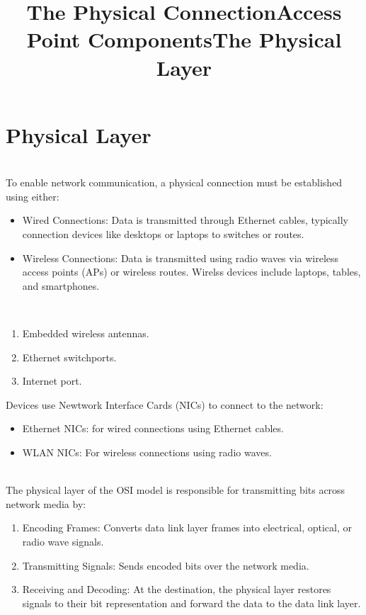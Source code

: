\documentclass[a4paper,11pt]{article}
\begin{document}
\newpage
\section{Physical Layer}
\title{The Physical Connection}\\
To enable network communication, a physical connection must be established using either:\\
\begin{itemize}
    \item Wired Connections: Data is transmitted through Ethernet cables, typically connection devices like desktops or laptops to switches or routes.\\
    \item Wireless Connections: Data is transmitted using radio waves via wireless access points (APs) or wireless routes. Wirelss devices include laptops, tables, and smartphones.\\
\end{itemize}

\title{Access Point Components}\\
\begin{enumerate}
    \item Embedded wireless antennas.\\
    \item Ethernet switchports.\\
    \item Internet port.\\
\end{enumerate}

Devices use Newtwork Interface Cards (NICs) to connect to the network:\\
\begin{itemize}
    \item Ethernet NICs: for wired connections using Ethernet cables.\\
    \item WLAN NICs: For wireless connections using radio waves.\\
\end{itemize}

\title{The Physical Layer}\\
The physical layer of the OSI model is responsible for transmitting bits across network media by:\\
\begin{enumerate}
    \item Encoding Frames: Converts data link layer frames into electrical, optical, or radio wave signals.\\
    \item Transmitting Signals: Sends encoded bits over the network media.\\
    \item Receiving and Decoding: At the destination, the physical layer restores signals to their bit representation and forward the data to the data link layer.\\
\end{enumerate}
\end{document}
